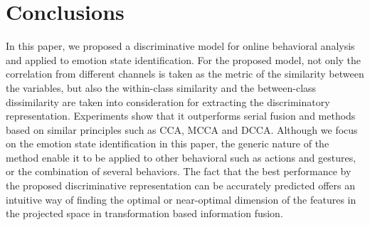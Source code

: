 \documentclass[10pt,journal,compsoc]{IEEEtran}
\begin{document}

\section{Conclusions}
In this paper, we proposed a discriminative model for online behavioral analysis and applied to emotion state identification. For the proposed model, not only the correlation from different channels is taken as the metric of the similarity between the variables, but also the within-class similarity and the between-class dissimilarity are taken into consideration for extracting the discriminatory representation. Experiments show that it outperforms serial fusion and methods based on similar principles such as CCA, MCCA and DCCA. Although we focus on the emotion state identification in this paper, the generic nature of the method enable it to be applied to other behavioral such as actions and gestures, or the combination of several behaviors. The fact that the best performance by the proposed discriminative representation can be accurately predicted offers an intuitive way of finding the optimal or near-optimal dimension of the features in the projected space in transformation based information fusion.
\end{document}
